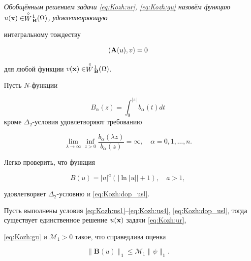 \smallskip

\begin{definition}[1]\it Обобщённым решением задачи \rm \eqref{eq:Kozh:ur}, \eqref{eq:Kozh:gu}  назовём функцию $u({\bf x}) \in\stackrel {\circ} {W}\!{}^{1}_{\mathbf{B}} ({\Omega})$, удовлетворяющую

интегральному тождеству

\begin{equation}\label{eq:Kozh:intt}

({\bf A}(u),v)=0

\end{equation}

для любой функции $v({\bf x}) \in\stackrel {\circ} {W}\!{}^{1}_{\bf B} (\Omega)$.

\end{definition}





\smallskip





Пусть $N$-функции

$$B_{\alpha}(z)=\int_0^{|z|}b_{\alpha}(t)dt$$ кроме $\Delta_2$-условия  удовлетворяют требованию

\begin{equation}\label{eq:Kozh:dop_usl}

\lim_{\lambda\to\infty}\inf\limits_{z> 0}\frac{b_\alpha(\lambda z)}{b_{\alpha}(z)}=\infty, \quad \alpha=0, 1,\ldots,n.

\end{equation}



\smallskip

\begin{example}[3]Легко проверить, что функция

$$B(u)=|u|^{a}(|\ln|u||+1),\quad a>1,$$

удовлетворяет $\Delta_2$-условию  и \eqref{eq:Kozh:dop_usl}.

\end{example}



\smallskip



\hypertarget{kozh:th1}{}

\begin{theorem}[1] Пусть выполнены условия \eqref{eq:Kozh:us1}--\eqref{eq:Kozh:us4}{\rm ,} \eqref{eq:Kozh:dop_usl}{\rm ,} тогда существует единственное решение $u({\bf x})$ задачи \eqref{eq:Kozh:ur}{\rm ,}

\eqref{eq:Kozh:gu}   и $\mathcal{M}_1>0$ такое{\rm ,} что  справедлива оценка

\begin{equation}\label{eq:Kozh:the_3}

\|\mathbf{B}(u)\|_1\leq

\mathcal{M}_1\|\psi\|_1.

\end{equation}

\end{theorem}




